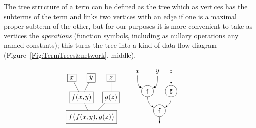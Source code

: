 \documentclass{article}
\theoremstyle{definition}
\begin{document}
The tree structure of a term can be defined as the tree which as 
vertices has the subterms of the term and links two vertices with an 
edge if one is a maximal proper subterm of the other, but for our 
purposes it is more convenient to take as vertices the 
\emph{operations} (function symbols, including as nullary operations 
any named constants); this turns the tree into a kind of data-flow 
diagram (Figure~\ref{Fig:TermTrees&network}, middle). 
\begin{figure}
  \[
    \begin{tabular}{c@{\qquad}c@{\qquad}c}
      \begin{tikzpicture}
        \node[draw] (r1c1) at (0,2) {$x$};
        \node[draw] (r1c2) at (1,2) {$y$};
        \node[draw] (r1c3) at (2,2) {$z$};
        \node[draw] (r2c12) at (0.5,1) {$f(x,y)$};
        \node[draw] (r2c3) at (2,1) {$g(z)$};
        \node[draw] (r3c2) at (1,0) {$f\bigl( f(x,y), g(z) \bigr)$};
        \draw (r1c1) -- (r2c12) 
              (r1c2) -- (r2c12) 
              (r2c12) -- (r3c2)
              (r1c3) -- (r2c3) -- (r3c2);
      \end{tikzpicture}%
      &
      \begin{tikzpicture}[>=latex]
        \node (r1c1) at (0,2) {$x$};
        \node (r1c2) at (1,2) {$y$};
        \node (r1c3) at (1.7,2) {$z$};
        \node[draw,circle] (r2c12) at (0.5,1) {$\mathsf{f}$};
        \node[draw,circle] (r2c3) at (1.7,1) {$\mathsf{g}$};
        \node[draw,circle] (r3c2) at (1.1,0) {$\mathsf{f}$};
        \draw[->] (r1c1) to[out=-90,in=150] (r2c12);
        \draw[->] (r1c2) to[out=-90,in=30] (r2c12);
        \draw[->] (r2c12) to[out=-90,in=150] (r3c2);
        \draw[->] (r1c3) -- (r2c3);
        \draw[->] (r2c3) to[out=-90,in=30] (r3c2);
        \draw[->] (r3c2) -- ++(0,-0.65);
      \end{tikzpicture}%
      &

\end{tabular}\]
\end{figure}
\end{document}
